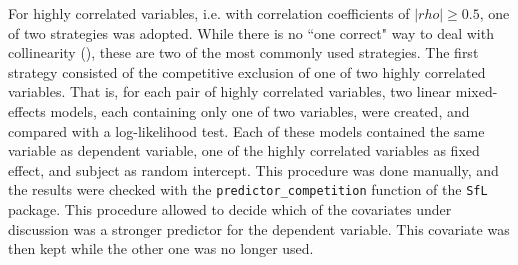For highly correlated variables, i.e. with correlation coefficients of $|rho|≥0.5$, one of two strategies was adopted. While there is no ``one correct" way to deal with collinearity (\cite{Tomaschek2018collin}), these are two of the most commonly used strategies. The first strategy consisted of the competitive exclusion of one of two highly correlated variables. That is, for each pair of highly correlated variables, two linear mixed-effects models, each containing only one of two variables, were created, and compared with a log-likelihood test. Each of these models contained the same variable as dependent variable, one of the highly correlated variables as fixed effect, and subject as random intercept. This procedure was done manually, and the results were checked with the \texttt{predictor\_competition} function of the \texttt{SfL} package. This procedure allowed to decide which of the covariates under discussion was a stronger predictor for the dependent variable. This covariate was then kept while the other one was no longer used. 

